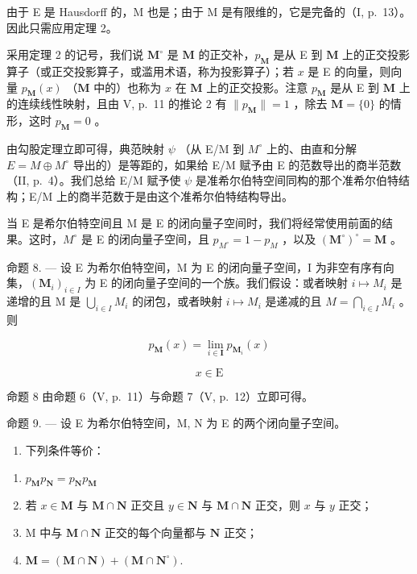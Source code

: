 由于 E 是 Hausdorff 的，M 也是；由于 M 是有限维的，它是完备的（I, p.~13）。因此只需应用定理 2。

采用定理 2 的记号，我们说 \(\mathbf{M}^{\circ}\) 是 \(\mathbf{M}\) 的正交补，\(p_{\mathbf{M}}\) 是从 E 到 \(\mathbf{M}\) 上的正交投影算子（或正交投影算子，或滥用术语，称为投影算子）；若 \(x\) 是 E 的向量，则向量 \(p_{\mathbf{M}}(x)\) （\(\mathbf{M}\) 中的）也称为 \(x\) 在 \(\mathbf{M}\) 上的正交投影。注意 \(p_{\mathbf{M}}\) 是从 E 到 \(\mathbf{M}\) 上的连续线性映射，且由 V, p.~11 的推论 2 有 \(\| p_{\mathbf{M}} \| = 1\) ，除去 \(\mathbf{M} = \{0\}\) 的情形，这时 \(p_{\mathbf{M}} = 0\) 。

由勾股定理立即可得，典范映射 \(\psi\) （从 E/M 到 \(M^{\circ}\) 上的、由直和分解 \(E = M \oplus M^{\circ}\) 导出的）是等距的，如果给 E/M 赋予由 E 的范数导出的商半范数（II, p.~4）。我们总给 E/M 赋予使 \(\psi\) 是准希尔伯特空间同构的那个准希尔伯特结构；E/M 上的商半范数于是由这个准希尔伯特结构导出。

当 E 是希尔伯特空间且 M 是 E 的闭向量子空间时，我们将经常使用前面的结果。这时，\(M^{\circ}\) 是 E 的闭向量子空间，且 \(p_{M^{\circ}} = 1 - p_{M}\) ，以及 \((\mathbf{M}^{\circ})^{\circ} = \mathbf{M}\) 。

命题 8. --- 设 E 为希尔伯特空间，M 为 E 的闭向量子空间，I 为非空有序有向集，\((\mathbf{M}_{i})_{i\in I}\) 为 E 的闭向量子空间的一个族。我们假设：或者映射 \(i\mapsto M_{i}\) 是递增的且 M 是 \(\bigcup_{i\in I}M_{i}\) 的闭包，或者映射 \(i\mapsto M_{i}\) 是递减的且 \(M=\bigcap_{i\in I}M_{i}\) 。则

\[
p _ {\mathbf {M}} (x) = \lim _ {i \in \mathbf {I}} p _ {\mathbf {M} _ {i}} (x)
\]

\[
x \in \mathrm{E}
\]

命题 8 由命题 6（V, p.~11）与命题 7（V, p.~12）立即可得。

命题 9. --- 设 E 为希尔伯特空间，M, N 为 E 的两个闭向量子空间。

\begin{enumerate}
\def\labelenumi{\alph{enumi})}
\tightlist
\item
  下列条件等价：
\end{enumerate}

\begin{enumerate}
\def\labelenumi{(\roman{enumi})}
\item
  \(p_{\mathbf{M}}p_{\mathbf{N}} = p_{\mathbf{N}}p_{\mathbf{M}}\)
\item
  若 \(x \in \mathbf{M}\) 与 \(\mathbf{M} \cap \mathbf{N}\) 正交且 \(y \in \mathbf{N}\) 与 \(\mathbf{M} \cap \mathbf{N}\) 正交，则 \(x\) 与 \(y\) 正交；
\item
  M 中与 \(\mathbf{M} \cap \mathbf{N}\) 正交的每个向量都与 \(\mathbf{N}\) 正交；
\item
  \(\mathbf{M} = (\mathbf{M}\cap \mathbf{N}) + (\mathbf{M}\cap \mathbf{N}^{\circ}).\)
\end{enumerate}

